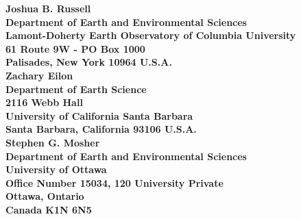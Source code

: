 \documentclass[10pt,titlepage]{article}
\providecommand{\DIFdelbegin}{} %
\begin{document}
\newpage
{\bfseries\sffamily 
\noindent Joshua B. Russell \\
Department of Earth and Environmental Sciences \\
Lamont-Doherty Earth Observatory of Columbia University \\
61 Route 9W - PO Box 1000 \\
Palisades, New York 10964 U.S.A. \\

\noindent Zachary Eilon \\
Department of Earth Science \\
2116 Webb Hall \\
University of California Santa Barbara \\
Santa Barbara, California 93106 U.S.A. \\

\noindent Stephen G. Mosher \\
Department of Earth and Environmental Sciences \\
University of Ottawa \\
Office Number 15034, 120 University Private \\
Ottawa, Ontario \\
Canada K1N 6N5
}
\newpage
%
%

\DIFdelbegin %
\end{document}
